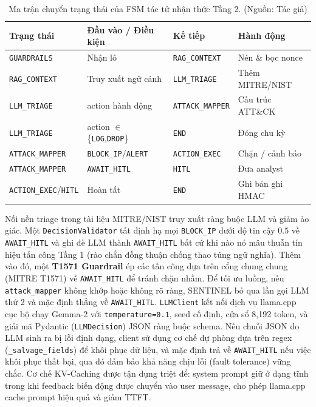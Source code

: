 \begin{table}[!htbp]
    \centering
    \caption{Ma trận chuyển trạng thái của FSM tác tử nhận thức Tầng 2. (Nguồn: Tác giả)}
    \label{tab:agent_fsm_transitions}
    \begin{tabular}{|>{\raggedright\arraybackslash}p{}|>{\raggedright\arraybackslash}p{}|>{\raggedright\arraybackslash}p{}|>{\raggedright\arraybackslash}p{}|}
        \hline
        \textbf{Trạng thái} & \textbf{Đầu vào / Điều kiện} & \textbf{Kế tiếp} & \textbf{Hành động} \\
        \hline
        \texttt{GUARDRAILS} & Nhận lô & \texttt{RAG\_CONTEXT} & Nén \& bọc nonce \\ \hline
        \texttt{RAG\_CONTEXT} & Truy xuất ngữ cảnh & \texttt{LLM\_TRIAGE} & Thêm MITRE/NIST \\ \hline
        \texttt{LLM\_TRIAGE} & action hành động & \texttt{ATTACK\_MAPPER} & Cấu trúc ATT\&CK \\ \hline
        \texttt{LLM\_TRIAGE} & action $\in$ \{\texttt{LOG},\texttt{DROP}\} & \texttt{END} & Đóng chu kỳ \\ \hline
        \texttt{ATTACK\_MAPPER} & \texttt{BLOCK\_IP}/\texttt{ALERT} & \texttt{ACTION\_EXEC} & Chặn / cảnh báo \\ \hline
        \texttt{ATTACK\_MAPPER} & \texttt{AWAIT\_HITL} & \texttt{HITL} & Đưa analyst \\ \hline
        \texttt{ACTION\_EXEC}/\texttt{HITL} & Hoàn tất & \texttt{END} & Ghi bản ghi HMAC \\ \hline
    \end{tabular}
\end{table}

Nối nền triage trong tài liệu MITRE/NIST truy xuất ràng buộc LLM và giảm ảo giác. Một \texttt{DecisionValidator} tất định hạ mọi \texttt{BLOCK\_IP} dưới độ tin cậy $0.5$ về \texttt{AWAIT\_HITL} và ghi đè LLM thành \texttt{AWAIT\_HITL} bất cứ khi nào nó mâu thuẫn tín hiệu tấn công Tầng 1 (rào chắn đồng thuận chống thao túng ngữ nghĩa). Thêm vào đó, một \textbf{T1571 Guardrail} ép các tấn công dựa trên cổng chung chung (MITRE T1571) về \texttt{AWAIT\_HITL} để tránh chặn nhầm. Để tối ưu luồng, nếu \texttt{attack\_mapper} không khớp hoặc không rõ ràng, SENTINEL bỏ qua lần gọi LLM thứ 2 và mặc định thẳng về \texttt{AWAIT\_HITL}. \texttt{LLMClient} kết nối dịch vụ llama.cpp cục bộ chạy Gemma-2 với \texttt{temperature=0.1}, seed cố định, cửa sổ 8{,}192 token, và giải mã Pydantic (\texttt{LLMDecision}) JSON ràng buộc schema. Nếu chuỗi JSON do LLM sinh ra bị lỗi định dạng, client sử dụng cơ chế dự phòng dựa trên regex (\texttt{\_salvage\_fields}) để khôi phục dữ liệu, và mặc định trả về \texttt{AWAIT\_HITL} nếu việc khôi phục thất bại, qua đó đảm bảo khả năng chịu lỗi (fault tolerance) vững chắc. Cơ chế KV-Caching được tận dụng triệt để: system prompt giữ ở dạng tĩnh trong khi feedback biến động được chuyển vào user message, cho phép llama.cpp cache prompt hiệu quả và giảm TTFT.

